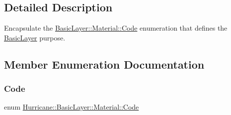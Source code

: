 \subsection{Detailed Description}
Encapsulate the \mbox{\hyperlink{classHurricane_1_1BasicLayer_1_1Material_a3e815440ad4b86b3569fa54ca06fc3e8}{Basic\+Layer\+::\+Material\+::\+Code}} enumeration that defines the \mbox{\hyperlink{classHurricane_1_1BasicLayer}{Basic\+Layer}} purpose. 

\subsection{Member Enumeration Documentation}
\mbox{\label{classHurricane_1_1BasicLayer_1_1Material_a3e815440ad4b86b3569fa54ca06fc3e8}} 
\subsubsection{\texorpdfstring{Code}{Code}}
{\footnotesize\ttfamily enum \mbox{\hyperlink{classHurricane_1_1BasicLayer_1_1Material_a3e815440ad4b86b3569fa54ca06fc3e8}{Hurricane\+::\+Basic\+Layer\+::\+Material\+::\+Code}}}

